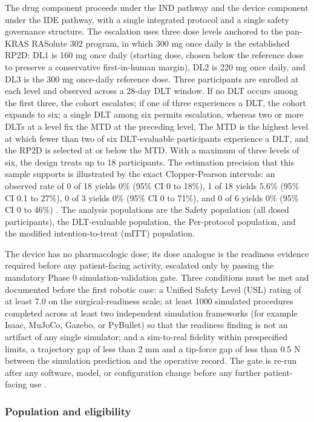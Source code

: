 The drug component proceeds under the IND pathway and the device component under
the IDE pathway, with a single integrated protocol and a single safety governance
structure. The escalation uses three dose levels anchored to the pan-KRAS RASolute
302 program, in which 300 mg once daily is the established RP2D: DL1 is 160 mg once
daily (starting dose, chosen below the reference dose to preserve a conservative
first-in-human margin), DL2 is 220 mg once daily, and DL3 is the 300 mg once-daily
reference dose. Three participants are enrolled at each level and observed across a
28-day DLT window. If no DLT occurs among the first three, the cohort escalates; if
one of three experiences a DLT, the cohort expands to six; a single DLT among six
permits escalation, whereas two or more DLTs at a level fix the MTD at the
preceding level. The MTD is the highest level at which fewer than two of six
DLT-evaluable participants experience a DLT, and the RP2D is selected at or below
the MTD. With a maximum of three levels of six, the design treats up to 18
participants. The estimation precision that this sample supports is illustrated by
the exact Clopper-Pearson intervals: an observed rate of 0 of 18 yields 0\% (95\%
CI 0 to 18\%), 1 of 18 yields 5.6\% (95\% CI 0.1 to 27\%), 0 of 3 yields 0\% (95\%
CI 0 to 71\%), and 0 of 6 yields 0\% (95\% CI 0 to 46\%) \cite{daraxwhipple}. The
analysis populations are the Safety population (all dosed participants), the
DLT-evaluable population, the Per-protocol population, and the modified
intention-to-treat (mITT) population.

The device has no pharmacologic dose; its dose analogue is the readiness evidence
required before any patient-facing activity, escalated only by passing the
mandatory Phase 0 simulation-validation gate. Three conditions must be met and
documented before the first robotic case: a Unified Safety Level (USL) rating of at
least 7.0 on the surgical-readiness scale; at least 1000 simulated procedures
completed across at least two independent simulation frameworks (for example Isaac,
MuJoCo, Gazebo, or PyBullet) so that the readiness finding is not an artifact of any
single simulator; and a sim-to-real fidelity within prespecified limits, a
trajectory gap of less than 2 mm and a tip-force gap of less than 0.5 N between the
simulation prediction and the operative record. The gate is re-run after any
software, model, or configuration change before any further patient-facing use
\cite{onpremwhippl,fdadigtwinpc}.

\subsubsection*{Population and eligibility}

